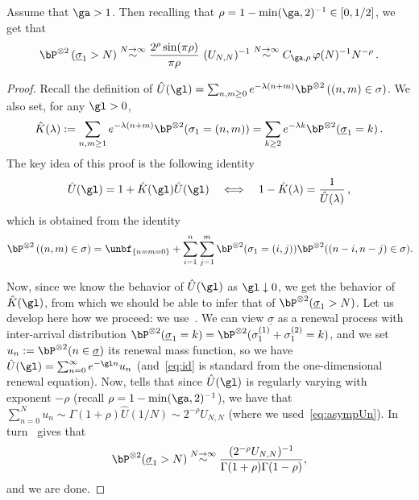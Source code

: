 \begin{appendix}
\begin{lemm}\label{lem:tau1}
Assume that $\ga>1$. Then recalling that $\rho=1-\min(\ga,2)^{-1} \in[0,1/2]$, we get that
\begin{equation}
\bP^{\otimes 2} \left(\underline{\sigma}_1 > N \right) \stackrel{N \to \infty}\sim \frac{2^{\rho} \sin(\pi \rho)}{ \pi \rho} \ (U_{N,N})^{-1} \stackrel{N \to \infty}\sim C_{\ga,\rho}\,\varphi(N)^{-1} N^{-\rho}\,.
\end{equation}
\end{lemm}

\begin{proof}
Recall the definition of $\hat U (\gl) = \sum_{n,m \ge 0} e^{- \lambda (n+m)} \bP^{\otimes 2} \left((n,m) \in \sigma \right) $. We also set, for any $\gl>0$,
\begin{equation}
\hat{K}(\lambda) := \sum_{n,m \ge 1} e^{- \lambda (n+m)} \bP^{\otimes 2} (\sigma_1 = (n,m)) = \sum_{k \ge 2} e^{- \lambda k} \bP^{\otimes 2} (\underline{\sigma}_1 = k)\,.
\end{equation}
The key idea of this proof is the following identity
\begin{equation}\label{eq:id}
\hat U(\gl) = 1+ \hat K(\gl) \hat U(\gl) \quad\Longleftrightarrow \quad 1- \hat{K}(\lambda) = \frac{1}{\hat{U}(\lambda)}\,,
\end{equation}
which is obtained from the identity
\begin{equation}
\bP^{\otimes 2} \left((n,m) \in \sigma \right) = \unbf_{\{n=m=0\}} + \sum_{i=1}^{n}\sum_{j=1}^{m} \bP^{\otimes 2} (\sigma_1 = (i,j)) \bP^{\otimes 2} ((n-i,n-j) \in\sigma).\!
\end{equation}

Now, since we know the behavior of $\hat U(\gl)$ as $\gl\downarrow0$, we get the behavior of $\hat K(\gl)$, from which we should be able to infer that of $\bP^{\otimes 2}(\underline \sigma_1 >N)$. Let us develop here how we proceed: we use~\cite[Corollary~1.7.3 and Theorem~8.7.3]{cf:BGT}. We can view $\underline\sigma$ as a renewal process with inter-arrival distribution $\bP^{\otimes 2} (\underline \sigma_1=k) = \bP^{\otimes 2} (\sigma_1^{(1)} + \sigma_1^{(2)}=k)$, and we set $u_n:= \bP^{\otimes 2} (n \in \underline \sigma)$ its renewal mass function, so we have $\hat U(\gl) = \sum_{n=0}^{\infty} e^{-\gl n} u_n$ (and~\eqref{eq:id} is standard from the one-dimensional renewal equation). Now, \cite[Corollary~1.7.3]{cf:BGT} tells that since $\hat U(\gl)$ is regularly varying with exponent $-\rho$ (recall $\rho = 1-\min(\ga,2)^{-1}$), we have that $\sum_{n=0}^N u_n \sim \Gamma(1+\rho) \hat U(1/N) \sim 2^{-\rho} U_{N,N}$ (where we used~\eqref{eq:asympUn}). In turn~\cite[Theorem~8.7.3]{cf:BGT} gives that
\[
\bP^{\otimes 2} (\underline\sigma _1 >N) \stackrel{N\to\infty}{\sim} \frac{(2^{-\rho} U_{N,N})^{-1}}{\Gamma(1+\rho) \Gamma(1-\rho)},
\]
and we are done.
\end{proof}


\end{appendix}

